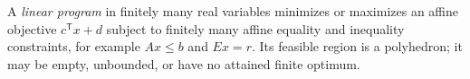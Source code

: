 
A \emph{linear program} in finitely many real variables minimizes or maximizes an affine objective $c^{\mathsf T}x+d$ subject to finitely many affine equality and inequality constraints, for example $Ax\le b$ and $Ex=r$. Its feasible region is a polyhedron; it may be empty, unbounded, or have no attained finite optimum.
